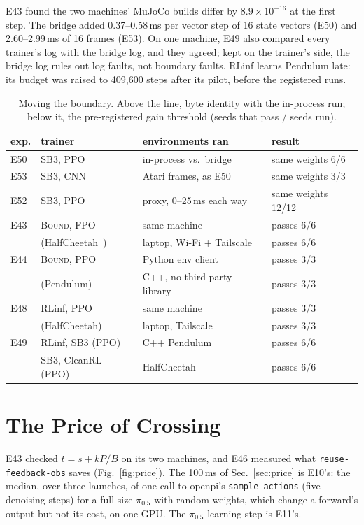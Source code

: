 \documentclass[conference]{IEEEtran}
\newcommand{\sys}{\textsc{Bound}}
\newcommand{\sys}{PlugRL}
\begin{document}
E43 found the two machines' MuJoCo builds differ by $8.9\times10^{-16}$ at
the first step. The bridge added 0.37--0.58\,ms per vector step of 16
state vectors (E50) and 2.60--2.99\,ms of 16 frames (E53).
On one machine, E49 also compared every trainer's log with the bridge log,
and they agreed; kept on the trainer's side, the bridge log rules out log
faults, not boundary faults. RLinf learns Pendulum late: its budget
was raised to 409,600 steps after its pilot, before the registered runs.

\begin{table}[H]
\centering
\caption{Moving the boundary. Above the line, byte identity with the
in-process run; below it, the pre-registered gain threshold (seeds that
pass / seeds run).}
\label{tab:moving}
\footnotesize
\setlength{\tabcolsep}{2pt}
\begin{tabular}{@{}llll@{}}
\toprule
exp. & trainer & environments ran & result \\
\midrule
E50 & SB3, PPO & in-process vs.\ bridge & same weights 6/6 \\
E53 & SB3, CNN & Atari frames, as E50 & same weights 3/3 \\
E52 & SB3, PPO & proxy, 0--25\,ms each way & same weights 12/12 \\
\midrule
E43 & \sys{}, FPO~\cite{mcallister2025fpo} & same machine & passes 6/6 \\
    & (HalfCheetah~\cite{todorov2012mujoco}) & laptop, Wi-Fi + Tailscale & passes 6/6 \\
E44 & \sys{}, PPO~\cite{schulman2017ppo} & Python env client & passes 3/3 \\
    & (Pendulum)         & C++, no third-party library & passes 3/3 \\
E48 & RLinf, PPO         & same machine & passes 3/3 \\
    & (HalfCheetah)      & laptop, Tailscale & passes 3/3 \\
E49 & RLinf, SB3 (PPO) & C++ Pendulum & passes 6/6 \\
    & SB3, CleanRL (PPO) & HalfCheetah  & passes 6/6 \\
\bottomrule
\end{tabular}
\end{table}

\section{The Price of Crossing}
\label{app:price}

E43 checked $t = s + kP/B$ on its two machines, and E46 measured what
\texttt{reuse-feedback-obs} saves (Fig.~\ref{fig:price}). The 100\,ms of
Sec.~\ref{sec:price} is E10's: the median, over three launches, of one call
to openpi's \texttt{sample\_actions} (five denoising steps) for a
full-size $\pi_{0.5}$ with random weights, which change a forward's output
but not its cost, on one GPU. The $\pi_{0.5}$ learning step is E11's.
\end{document}
